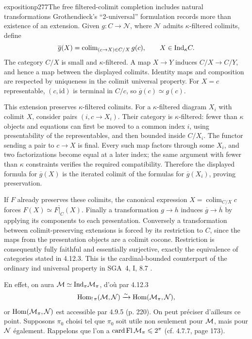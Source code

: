 \begin{dcomment}{exposition}{p277}{The free filtered-colimit completion includes natural transformations}
Grothendieck's ``2-universal'' formulation records more than existence of an extension. Given $g:C\to\mathcal N$, where $\mathcal N$ admits $\kappa$-filtered colimits, define
\[
 \overline g(X)=\operatorname{colim}_{(c\to X)\in C/X}g(c),
 \qquad X\in\mathrm{Ind}_\kappa C.
\]
The category $C/X$ is small and $\kappa$-filtered. A map $X\to Y$ induces $C/X\to C/Y$, and hence a map between the displayed colimits. Identity maps and composition are respected by uniqueness in the colimit universal property. For $X=c$ representable, $(c,\mathrm{id})$ is terminal in $C/c$, so $\overline g(c)\simeq g(c)$.

This extension preserves $\kappa$-filtered colimits. For a $\kappa$-filtered diagram $X_i$ with colimit $X$, consider pairs $(i,c\to X_i)$. Their category is $\kappa$-filtered: fewer than $\kappa$ objects and equations can first be moved to a common index $i$, using presentability of the representables, and then bounded inside $C/X_i$. The functor sending a pair to $c\to X$ is final. Every such map factors through some $X_i$, and two factorizations become equal at a later index; the same argument with fewer than $\kappa$ constraints verifies the required compatibility. Therefore the displayed formula for $\overline g(X)$ is the iterated colimit of the formulas for $\overline g(X_i)$, proving preservation.

If $F$ already preserves these colimits, the canonical expression $X=\operatorname{colim}_{C/X}c$ forces $F(X)\simeq\overline{F|_C}(X)$. Finally a transformation $g\to h$ induces $\overline g\to\overline h$ by applying its components to each presentation. Conversely a transformation between colimit-preserving extensions is forced by its restriction to $C$, since the maps from the presentation objects are a colimit cocone. Restriction is consequently fully faithful and essentially surjective, exactly the equivalence of categories stated in 4.12.3. This is the cardinal-bounded counterpart of the ordinary ind universal property in SGA~4, I, 8.7 \citep{SGA4I1972}.
\end{dcomment}


En effet, on aura $\mathcal{M} \simeq \mathrm{Ind}_\pi\mathcal{M}_\pi$, d'où par 4.12.3
\[
\operatorname{Hom}_{!\,\pi}(\mathcal{M},\mathcal{N}) \xrightarrow{\sim} \operatorname{Hom}(\mathcal{M}_\pi,\mathcal{N}) ,
\]
or $\operatorname{Hom}(\mathcal{M}_\pi,\mathcal{N})$ est accessible par 4.9.5 (p. 220). On peut préciser d'ailleurs ce point. Supposons $\pi_0$ choisi tel que $\pi_0$ soit utile non seulement pour $\mathcal{M}$, mais pour $\mathcal{N}$ également. Rappelons que l'on a $\operatorname{card}\operatorname{Fl}\mathcal{M}_\pi \leqslant 2^\pi$ (cf. 4.7.7, page 173).

